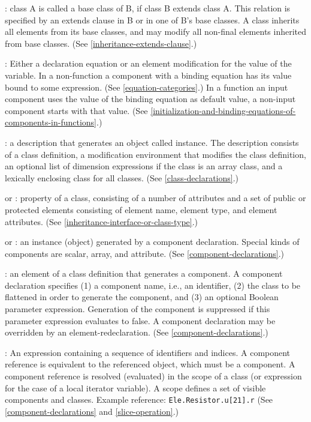 : class A is called a base class of B, if class B
extends class A. This relation is specified by an extends clause in B or
in one of B's base classes. A class inherits all elements from its base
classes, and may modify all non-final elements inherited from base
classes. (See \cref{inheritance-extends-clause}.)

: Either a declaration equation or an element
modification for the value of the variable. In a non-function a component with a binding
equation has its value bound to some expression. (See \cref{equation-categories}.)
In a function an input component uses the value of the binding equation as default value,
a non-input component starts with that value.
(See \cref{initialization-and-binding-equations-of-components-in-functions}.)

: a description that generates an object called instance.
The description consists of a class definition, a modification
environment that modifies the class definition, an optional list of
dimension expressions if the class is an array class, and a lexically
enclosing class for all classes. (See \cref{class-declarations}.)

 or : property of a
class, consisting of a number of attributes and a set of public or
protected elements consisting of element name, element type, and element
attributes. (See \cref{inheritance-interface-or-class-type}.)

 or : an instance (object) generated
by a component declaration. Special kinds of components are scalar,
array, and attribute. (See \cref{component-declarations}.)

: an element of a class definition that
generates a component. A component declaration specifies (1) a component
name, i.e., an identifier, (2) the class to be flattened in order to
generate the component, and (3) an optional Boolean parameter
expression. Generation of the component is suppressed if this parameter
expression evaluates to false. A component declaration may be overridden
by an element-redeclaration. (See \cref{component-declarations}.)

: An expression containing a sequence of
identifiers and indices. A component reference is equivalent to the
referenced object, which must be a component. A component reference is
resolved (evaluated) in the scope of a class (or expression for the case
of a local iterator variable). A scope defines a set of visible
  components and classes. Example reference: \lstinline!Ele.Resistor.u[21].r! (See
\cref{component-declarations} and \cref{slice-operation}.)


